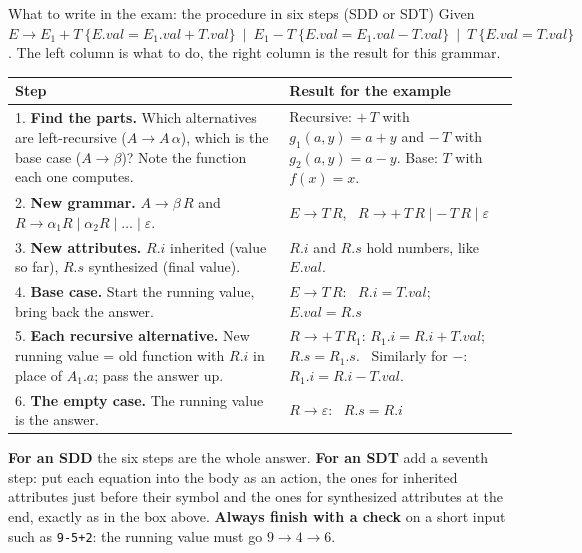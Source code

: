 \documentclass[11pt,a4paper]{article}
\begin{document}
\begin{examplebox}{What to write in the exam: the procedure in six steps (SDD or SDT)}
Given $E\to E_1+T\ \{E.val=E_1.val+T.val\}\ \mid\ E_1-T\ \{E.val=E_1.val-T.val\}\ \mid\ T\ \{E.val=T.val\}$. The left column is what to do, the right column is the result for this grammar.
\begin{center}
\small
\begin{tabular}{@{}p{5.8cm} p{8.6cm}@{}}
\toprule
\textbf{Step} & \textbf{Result for the example} \\ \midrule
1. \textbf{Find the parts.} Which alternatives are left-recursive ($A\to A\,\alpha$), which is the base case ($A\to\beta$)? Note the function each one computes.
  & Recursive: $+\,T$ with $g_1(a,y)=a+y$ and $-\,T$ with $g_2(a,y)=a-y$. Base: $T$ with $f(x)=x$. \\[3pt]
2. \textbf{New grammar.} $A\to\beta\,R$ and $R\to\alpha_1R\mid\alpha_2R\mid\dots\mid\varepsilon$.
  & $E\to T\,R$, \ $R\to +\,T\,R\mid -\,T\,R\mid\varepsilon$ \\[3pt]
3. \textbf{New attributes.} $R.i$ inherited (value so far), $R.s$ synthesized (final value).
  & $R.i$ and $R.s$ hold numbers, like $E.val$. \\[3pt]
4. \textbf{Base case.} Start the running value, bring back the answer.
  & $E\to T\,R$: \ $R.i=T.val$; \ $E.val=R.s$ \\[3pt]
5. \textbf{Each recursive alternative.} New running value = old function with $R.i$ in place of $A_1.a$; pass the answer up.
  & $R\to +\,T\,R_1$: $R_1.i=R.i+T.val$; $R.s=R_1.s$. \ Similarly for $-$: $R_1.i=R.i-T.val$. \\[3pt]
6. \textbf{The empty case.} The running value is the answer.
  & $R\to\varepsilon$: \ $R.s=R.i$ \\ \bottomrule
\end{tabular}
\end{center}
\textbf{For an SDD} the six steps are the whole answer. \textbf{For an SDT} add a seventh step: put each equation into the body as an action, the ones for inherited attributes just before their symbol and the ones for synthesized attributes at the end, exactly as in the box above. \textbf{Always finish with a check} on a short input such as \texttt{9-5+2}: the running value must go $9\to4\to6$.
\end{examplebox}
\end{document}
